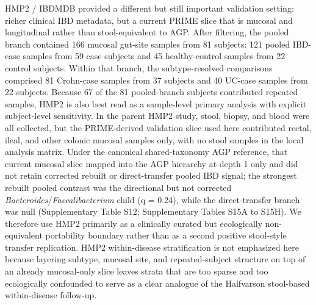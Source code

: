 \documentclass[
  11pt,
]{article}
\newcommand{\taxon}[1]{\emph{#1}}
\newcommand{\dcstsep}{/\allowbreak}
\begin{document}
HMP2 / IBDMDB provided a different but still important validation
setting: richer clinical IBD metadata, but a current PRIME slice that is
mucosal and longitudinal rather than stool-equivalent to AGP. After
filtering, the pooled branch contained 166 mucosal gut-site samples from
81 subjects: 121 pooled IBD-case samples from 59 case subjects and 45
healthy-control samples from 22 control subjects. Within that branch,
the subtype-resolved comparisons comprised 81 Crohn-case samples from 37
subjects and 40 UC-case samples from 22 subjects. Because 67 of the 81
pooled-branch subjects contributed repeated samples, HMP2 is also best
read as a sample-level primary analysis with explicit subject-level
sensitivity. In the parent HMP2 study, stool, biopsy, and blood were
all collected, but the PRIME-derived validation slice used here
contributed rectal, ileal, and other colonic mucosal samples only, with
no stool samples in the local analysis matrix. Under the canonical
shared-taxonomy AGP reference, that current mucosal slice mapped into
the AGP hierarchy at depth 1 only and did not retain corrected rebuilt
or direct-transfer pooled IBD signal; the strongest rebuilt pooled
contrast was the directional but not corrected
\taxon{Bacteroides}\dcstsep\taxon{Faecalibacterium} child
(q = 0.24), while the direct-transfer branch was null
(Supplementary Table S12; Supplementary Tables S15A to S15H). We
therefore use HMP2 primarily as a clinically curated but ecologically
non-equivalent portability boundary rather than as a second positive
stool-style transfer replication. HMP2
within-disease stratification is not emphasized here because layering
subtype, mucosal site, and repeated-subject structure on top of an
already mucosal-only slice leaves strata that are too sparse and too
ecologically confounded to serve as a clear analogue of the Halfvarson
stool-based within-disease follow-up.
\end{document}
